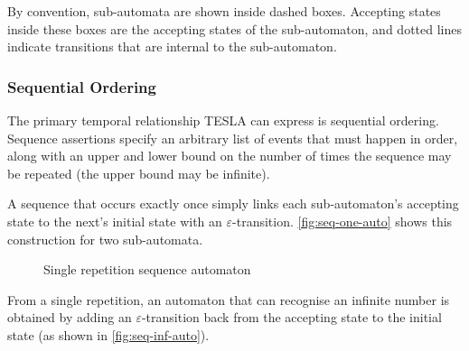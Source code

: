 By convention, sub-automata are shown inside dashed boxes. Accepting states
inside these boxes are the accepting states of the sub-automaton, and dotted
lines indicate transitions that are internal to the sub-automaton.

\subsubsection{Sequential Ordering}

The primary temporal relationship TESLA can express is sequential
ordering. Sequence assertions specify an arbitrary list of events that
must happen in order, along with an upper and lower bound on the number
of times the sequence may be repeated (the upper bound may be infinite).

A sequence that occurs exactly once simply links each sub-automaton's
accepting state to the next's initial state with an
$\varepsilon$-transition.  \autoref{fig:seq-one-auto} shows this
construction for two sub-automata.

\begin{figure}[ht]
  \centering
  \caption{Single repetition sequence automaton}
  \label{fig:seq-one-auto}
\end{figure}

From a single repetition, an automaton that can recognise an infinite
number is obtained by adding an $\varepsilon$-transition back from the
accepting state to the initial state (as shown in
\autoref{fig:seq-inf-auto}).

